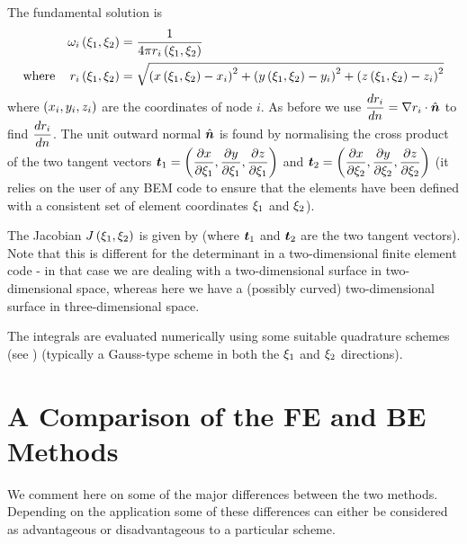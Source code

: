 The fundamental solution is 
\begin{alignat*}{2}
  &&  \omega_{i}\left( \xi_{1},\xi_{2} \right)  &= \dfrac{1}{4 \pi
     r_{i}\left( \xi_{1},\xi_{2} \right) } \\ \text{where} &&  r_{i}\left( \xi_{1},\xi_{2} \right) 
  &= \sqrt{\left(  x\left( \xi_{1},\xi_{2} \right) -x_{i} \right)^{2} +
    \left(  y\left( \xi_{1},\xi_{2} \right) -y_{i} \right)^{2} +
    \left(  z\left( \xi_{1},\xi_{2} \right) -z_{i} \right)^{2}}
\end{alignat*}
where $\left( x_{i},y_{i},z_{i} \right)$ are the coordinates of node $i$.  As before
we use $\dby{r_{i}}{n} = \dotprod{\grad r_{i}}{\hat{\vect{n}}}$ to find
$ \dfrac{ d r_{i}}{d n} $.  The unit outward normal $\hat{\vect{n}}$ is found by
normalising the cross product of the two tangent vectors $\vect{t}_{1} =
\pbrac{\delby{x}{\xi_{1}}, \delby{y}{\xi_{1}},\delby{z}{\xi_{1}}}$ and
$\vect{t}_{2} = \pbrac{\delby{x}{\xi_{2}},\delby{y}{\xi_{2}},\delby{z}{\xi_{2}}
}$ (it relies on the user of any BEM code to ensure that the elements
have been defined with a consistent set of element coordinates $\xi_{1}$ and
$\xi_{2}$).

The Jacobian $ J\left( \xi_{1},\xi_{2} \right) $ is given by  (where $\vect{t}_{1}$ and $\vect{t}_{2}$ are the two tangent
vectors).  Note that this is different for the determinant in a
two-dimensional finite element code - in that case we are dealing with a
two-dimensional surface in two-dimensional space, whereas here we have a
(possibly curved) two-dimensional surface in three-dimensional space.

The integrals are evaluated numerically using some suitable quadrature schemes
(see ) (typically a Gauss-type scheme in both the $\xi_{1}$
and $\xi_{2}$ directions).




\section{A Comparison of the FE and BE Methods}

We comment here on some of the major differences between the two methods.
Depending on the application some of these differences can either be
considered as advantageous or disadvantageous to a particular scheme.

